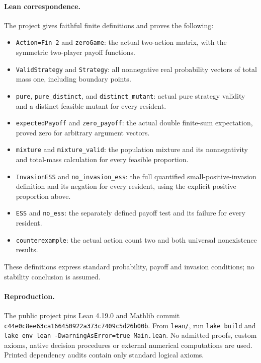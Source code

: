 \documentclass[11pt]{article}
\begin{document}
\paragraph{Lean correspondence.}
The project gives faithful finite definitions and proves the following:
\begin{itemize}
\item \texttt{Action=Fin 2} and \texttt{zeroGame}: the actual two-action matrix, with the symmetric two-player payoff functions.
\item \texttt{ValidStrategy} and \texttt{Strategy}: all nonnegative real probability vectors of total mass one, including boundary points.
\item \texttt{pure}, \texttt{pure\_distinct}, and \texttt{distinct\_mutant}: actual pure strategy validity and a distinct feasible mutant for every resident.
\item \texttt{expectedPayoff} and \texttt{zero\_payoff}: the actual double finite-sum expectation, proved zero for arbitrary argument vectors.
\item \texttt{mixture} and \texttt{mixture\_valid}: the population mixture and its nonnegativity and total-mass calculation for every feasible proportion.
\item \texttt{InvasionESS} and \texttt{no\_invasion\_ess}: the full quantified small-positive-invasion definition and its negation for every resident, using the explicit positive proportion above.
\item \texttt{ESS} and \texttt{no\_ess}: the separately defined payoff test and its failure for every resident.
\item \texttt{counterexample}: the actual action count two and both universal nonexistence results.
\end{itemize}
These definitions express standard probability, payoff and invasion conditions; no stability conclusion is assumed.

\paragraph{Reproduction.}
The public project pins Lean 4.19.0 and Mathlib commit
\texttt{c44e0c8ee63ca166450922a373c7409c5d26b00b}.
From \texttt{lean/}, run \texttt{lake build} and
\texttt{lake env lean -DwarningAsError=true Main.lean}.
No admitted proofs, custom axioms, native decision procedures or external numerical computations are used. Printed dependency audits contain only standard logical axioms.
\end{document}
